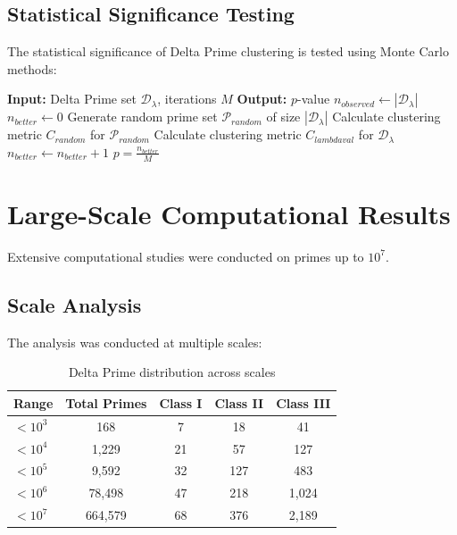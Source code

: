 \documentclass[12pt,a4paper]{report}
\newcommand{\lambdaval}{\lambda}
\begin{document}
\begin{itemize}
\subsection{Statistical Significance Testing}

The statistical significance of Delta Prime clustering is tested using Monte Carlo methods:

\begin{algorithm}[H]
\caption{Monte Carlo Significance Testing}
\begin{algorithmic}[1]
\STATE \textbf{Input:} Delta Prime set $\mathcal{D}_{\lambdaval}$, iterations $M$
\STATE \textbf{Output:} $p$-value
\STATE $n_{observed} \leftarrow |\mathcal{D}_{\lambdaval}|$
\STATE $n_{better} \leftarrow 0$
    \STATE Generate random prime set $\mathcal{P}_{random}$ of size $|\mathcal{D}_{\lambdaval}|$
    \STATE Calculate clustering metric $C_{random}$ for $\mathcal{P}_{random}$
    \STATE Calculate clustering metric $C_{lambdaval}$ for $\mathcal{D}_{\lambdaval}$
        \STATE $n_{better} \leftarrow n_{better} + 1$
    \ENDIF
\ENDFOR
\RETURN $p = \frac{n_{better}}{M}$
\end{algorithmic}
\end{algorithm}

\section{Large-Scale Computational Results}

Extensive computational studies were conducted on primes up to $10^7$.

\subsection{Scale Analysis}

The analysis was conducted at multiple scales:

\begin{table}[h]
\centering
\begin{tabular}{|l|c|c|c|c|}
\hline
\textbf{Range} & \textbf{Total Primes} & \textbf{Class I} & \textbf{Class II} & \textbf{Class III} \\
\hline
$< 10^3$ & 168 & 7 & 18 & 41 \\
$< 10^4$ & 1,229 & 21 & 57 & 127 \\
$< 10^5$ & 9,592 & 32 & 127 & 483 \\
$< 10^6$ & 78,498 & 47 & 218 & 1,024 \\
$< 10^7$ & 664,579 & 68 & 376 & 2,189 \\
\hline
\end{tabular}
\caption{Delta Prime distribution across scales}
\end{table}


\end{itemize}
\end{document}
